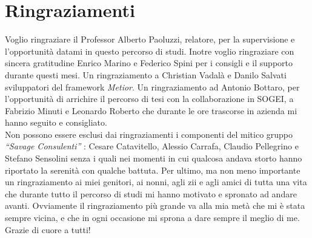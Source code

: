 \chapter{Ringraziamenti}
\label{cha:acknowledgements}

Voglio ringraziare il Professor Alberto Paoluzzi, relatore, per la supervisione e l'opportunità datami in questo percorso di studi.
Inotre voglio ringraziare con sincera gratitudine Enrico Marino e Federico Spini per i consigli e il supporto durante questi mesi.
Un ringraziamento a Christian Vadalà e Danilo Salvati sviluppatori del framework \emph{Metior}.
Un ringraziamento ad Antonio Bottaro, per l'opportunità di arrichire il percorso di tesi con la collaborazione in SOGEI,
a Fabrizio Minuti e Leonardo Roberto che durante le ore trascorse in azienda mi hanno seguito e consigliato.\\
Non possono essere esclusi dai ringraziamenti i componenti del mitico gruppo \emph{``Savage Consulenti''} :
Cesare Catavitello, Alessio Carrafa, Claudio Pellegrino e Stefano Sensolini senza i quali nei momenti in cui qualcosa andava
storto hanno riportato la serenità con qualche battuta.
Per ultimo, ma non meno importante un ringraziamento ai miei genitori, ai nonni, agli zii e agli amici di tutta una vita
che durante tutto il percorso di studi mi hanno motivato e spronato ad andare avanti.
Ovviamente il ringraziamento più grande va alla mia metà che mi è stata sempre vicina, e che in ogni occasione mi sprona
a dare sempre il meglio di me. Grazie di cuore a tutti!
